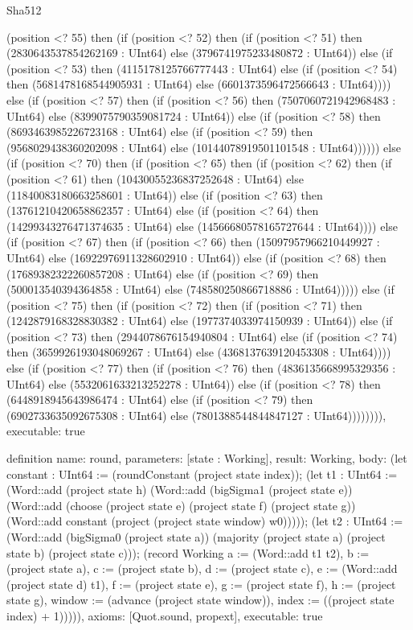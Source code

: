 \begin{lexlean}{Sha512}
\begin{semanticmodule}
{(position <? 55) then (if (position <? 52) then (if (position <? 51) then (2830643537854262169 : UInt64) else (3796741975233480872 : UInt64)) else (if (position <? 53) then (4115178125766777443 : UInt64) else (if (position <? 54) then (5681478168544905931 : UInt64) else (6601373596472566643 : UInt64)))) else (if (position <? 57) then (if (position <? 56) then (7507060721942968483 : UInt64) else (8399075790359081724 : UInt64)) else (if (position <? 58) then (8693463985226723168 : UInt64) else (if (position <? 59) then (9568029438360202098 : UInt64) else (10144078919501101548 : UInt64)))))) else (if (position <? 70) then (if (position <? 65) then (if (position <? 62) then (if (position <? 61) then (10430055236837252648 : UInt64) else (11840083180663258601 : UInt64)) else (if (position <? 63) then (13761210420658862357 : UInt64) else (if (position <? 64) then (14299343276471374635 : UInt64) else (14566680578165727644 : UInt64)))) else (if (position <? 67) then (if (position <? 66) then (15097957966210449927 : UInt64) else (16922976911328602910 : UInt64)) else (if (position <? 68) then (17689382322260857208 : UInt64) else (if (position <? 69) then (500013540394364858 : UInt64) else (748580250866718886 : UInt64))))) else (if (position <? 75) then (if (position <? 72) then (if (position <? 71) then (1242879168328830382 : UInt64) else (1977374033974150939 : UInt64)) else (if (position <? 73) then (2944078676154940804 : UInt64) else (if (position <? 74) then (3659926193048069267 : UInt64) else (4368137639120453308 : UInt64)))) else (if (position <? 77) then (if (position <? 76) then (4836135668995329356 : UInt64) else (5532061633213252278 : UInt64)) else (if (position <? 78) then (6448918945643986474 : UInt64) else (if (position <? 79) then (6902733635092675308 : UInt64) else (7801388544844847127 : UInt64)))))))),
  executable: true
}

definition{
  name: round,
  parameters: [state : Working],
  result: Working,
  body: (let constant : UInt64 := (roundConstant (project state index)); (let t1 : UInt64 := (Word::add (project state h) (Word::add (bigSigma1 (project state e)) (Word::add (choose (project state e) (project state f) (project state g)) (Word::add constant (project (project state window) w0))))); (let t2 : UInt64 := (Word::add (bigSigma0 (project state a)) (majority (project state a) (project state b) (project state c))); (record Working {a := (Word::add t1 t2), b := (project state a), c := (project state b), d := (project state c), e := (Word::add (project state d) t1), f := (project state e), g := (project state f), h := (project state g), window := (advance (project state window)), index := ((project state index) + 1)})))),
  axioms: [Quot.sound, propext],
  executable: true
}


\end{semanticmodule}
\end{lexlean}
